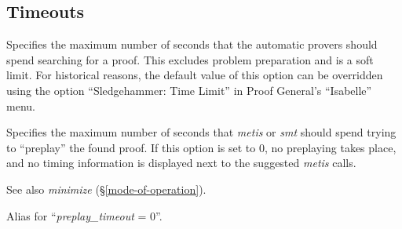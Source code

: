 \documentclass[a4paper,12pt]{article}
\begin{document}
\subsection{Timeouts}
\label{timeouts}

\begin{enum}
Specifies the maximum number of seconds that the automatic provers should spend
searching for a proof. This excludes problem preparation and is a soft limit.
For historical reasons, the default value of this option can be overridden using
the option ``Sledgehammer: Time Limit'' in Proof General's ``Isabelle'' menu.

Specifies the maximum number of seconds that \textit{metis} or \textit{smt}
should spend trying to ``preplay'' the found proof. If this option is set to 0,
no preplaying takes place, and no timing information is displayed next to the
suggested \textit{metis} calls.

\nopagebreak
{\small See also \textit{minimize} (\S\ref{mode-of-operation}).}

Alias for ``\textit{preplay\_timeout} = 0''.

\end{enum}

\let\em=\sl
{}

\end{document}
